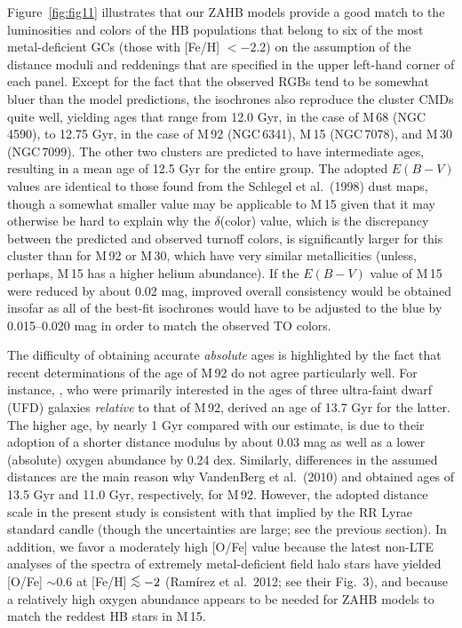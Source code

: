 \documentclass[12pt,preprint]{aastex}
\newcommand\lta{\mathrel{\hbox{\raise 0.6 ex \hbox{$<$}\kern
                   -1.8 ex\lower .5 ex\hbox{$\sim$}}}}
\begin{document}
Figure~\ref{fig:fig11} illustrates that our ZAHB models provide a good match to
the luminosities and colors of the HB populations that belong to six of the most
metal-deficient GCs (those with [Fe/H] $< -2.2$) on the assumption of the
distance moduli and reddenings that are specified in the upper left-hand corner
of each panel.  Except for the fact that the observed RGBs tend to be somewhat
bluer than the model predictions, the isochrones also reproduce the cluster CMDs
quite well, yielding ages that range from 12.0 Gyr, in the case of M$\,$68
(NGC$\,$4590), to 12.75 Gyr, in the case of M$\,$92 (NGC$\,$6341), M$\,$15
(NGC$\,$7078), and M$\,$30 (NGC$\,$7099).  The other two clusters are predicted
to have intermediate ages, resulting in a mean age of 12.5 Gyr for the entire
group.  The adopted $E(B-V)$ values are identical to those found from the
Schlegel et al.~(1998) dust maps, though a somewhat smaller value may be
applicable to M$\,$15 given that it may otherwise be hard to explain why the
$\delta$(color) value, which is the discrepancy between the predicted and
observed turnoff colors, is significantly larger for this cluster than for
M$\,$92 or M$\,$30, which have very similar metallicities (unless, perhaps,
M$\,$15 has a higher helium abundance).  If the $E(B-V)$ value of M$\,$15 were
reduced by about 0.02 mag, improved overall consistency would be obtained
insofar as all of the best-fit isochrones would have to be adjusted to the blue
by 0.015--0.020 mag in order to match the observed TO colors.

The difficulty of obtaining accurate {\it absolute} ages is highlighted by the
fact that recent determinations of the age of M$\,$92 do not agree particularly
well.  For instance, \citet{btg12}, who were primarily interested in the ages of
three ultra-faint dwarf (UFD) galaxies {\it relative} to that of M$\,$92,
derived an age of 13.7 Gyr for the latter.  The higher age, by nearly 1 Gyr
compared with our estimate, is due to their adoption of a shorter distance
modulus by about 0.03 mag as well as a lower (absolute) oxygen abundance by
0.24 dex.  Similarly, differences in the assumed distances are the main reason 
why VandenBerg et al.~(2010) and \citet{dic10} obtained ages of 13.5 Gyr
and 11.0 Gyr, respectively, for M$\,$92.  However, the adopted distance
scale in the present study is consistent with that implied by the RR Lyrae
standard candle (though the uncertainties are large; see the previous section).
In addition, we favor a moderately high [O/Fe] value because the latest non-LTE
analyses of the spectra of extremely metal-deficient field halo stars have
yielded [O/Fe] $\sim 0.6$ at [Fe/H] $\lta -2$ (Ram\'irez et al.~2012; see their
Fig.~3), and because a relatively high oxygen abundance appears to be needed for
ZAHB models to match the reddest HB stars in M$\,$15. 
\end{document}
